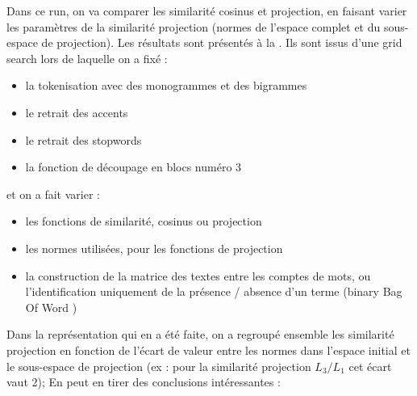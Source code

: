             Dans ce run, on va comparer les similarité cosinus et projection, en faisant varier les paramètres de la similarité projection (normes de l'espace complet et du sous-espace de projection).
            Les résultats sont présentés à la .
            Ils sont issus d'une grid search lors de laquelle on a fixé : 
            \begin{itemize}
                \item la tokenisation avec des monogrammes et des bigrammes
                \item le retrait des accents
                \item le retrait des stopwords
                \item la fonction de découpage en blocs numéro 3
            \end{itemize}
            et on a fait varier : 
            \begin{itemize}
                \item les fonctions de similarité, cosinus ou projection
                \item les normes utilisées, pour les fonctions de projection
                \item la construction de la matrice des textes entre les comptes de mots, ou l'identification uniquement de la présence / absence d'un terme (\og binary Bag Of Word \fg)
            \end{itemize}
            Dans la représentation qui en a été faite, on a regroupé ensemble les similarité projection en fonction de l'écart de valeur entre les normes dans l'espace initial et le sous-espace de projection (ex : pour la similarité projection $L_{3}/L_{1}$ cet écart vaut 2);
            En peut en tirer des conclusions intéressantes : 
